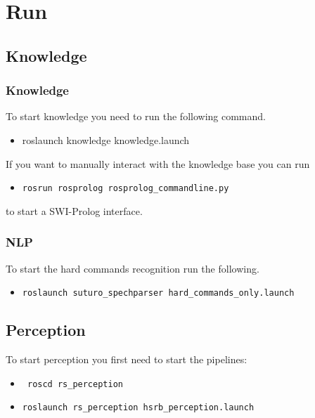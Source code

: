 \documentclass[main.tex]{subfiles}
\begin{document}
	\section{Run}
	\subsection{Knowledge}
	\subsubsection{Knowledge}
	To start knowledge you need to run the following command.
	\begin{itemize}
\item roslaunch knowledge knowledge.launch
\end{itemize}
If you want to manually interact with the knowledge base you can run 
\begin{itemize}
\item \begin{verbatim}rosrun rosprolog rosprolog_commandline.py \end{verbatim}
\end{itemize}
to start a SWI-Prolog interface.
	
	\subsubsection{NLP}
	
	To start the hard commands recognition run the following.
	
	\begin{itemize}
		\item \begin{verbatim}roslaunch suturo_spechparser hard_commands_only.launch \end{verbatim}
	\end{itemize}
	
	\subsection{Perception}

	To start perception you first need to start the pipelines:
	\begin{itemize}
\item \begin{verbatim} roscd rs_perception \end{verbatim} 
\item \begin{verbatim}
roslaunch rs_perception hsrb_perception.launch
\end{verbatim}
\end{itemize}	
\end{document}
